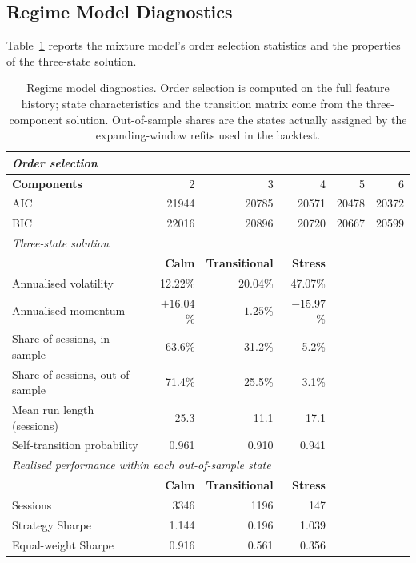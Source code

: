 \documentclass{singlecol-new}
\theoremstyle{TH}{
\newtheorem{lemma}{Lemma}
\newtheorem{theorem}[lemma]{Theorem}
\newtheorem{corrolary}[lemma]{Corrolary}
\newtheorem{conjecture}[lemma]{Conjecture}
\newtheorem{proposition}[lemma]{Proposition}
\newtheorem{claim}[lemma]{Claim}
\newtheorem{stheorem}[lemma]{Wrong Theorem}
\newtheorem{algorithm}{Algorithm}
}
\theoremstyle{THrm}{
\newtheorem{definition}{Definition}[section]
\newtheorem{question}{Question}[section]
\newtheorem{remark}{Remark}
\newtheorem{scheme}{Scheme}
}
\theoremstyle{THhit}{
\newtheorem{case}{Case}[section]
}
\begin{document}
\subsection{Regime Model Diagnostics}
\label{sec:regimefit}

Table~\ref{tab:regimefit} reports the mixture model's order selection statistics and the properties of
the three-state solution.

\begin{table}[!ht]
\centering
\caption{Regime model diagnostics. Order selection is computed on the full feature
history; state characteristics and the transition matrix come from the three-component
solution. Out-of-sample shares are the states actually assigned by the expanding-window
refits used in the backtest.}
\label{tab:regimefit}
\small
\begin{tabular}{p{3.2cm}rrrrr}
\hline
\multicolumn{6}{l}{\textit{Order selection}} \\
\hline
\textbf{Components} & 2 & 3 & 4 & 5 & 6 \\
AIC & 21944 & 20785 & 20571 & 20478 & 20372 \\
BIC & 22016 & 20896 & 20720 & 20667 & 20599 \\
\hline
\multicolumn{6}{l}{\textit{Three-state solution}} \\
\hline
& \textbf{Calm} & \textbf{Transitional} & \textbf{Stress} & & \\
Annualised volatility & 12.22\% & 20.04\% & 47.07\% & & \\
Annualised momentum & $+16.04$\% & $-1.25$\% & $-15.97$\% & & \\
Share of sessions, in sample & 63.6\% & 31.2\% & 5.2\% & & \\
Share of sessions, out of sample & 71.4\% & 25.5\% & 3.1\% & & \\
Mean run length (sessions) & 25.3 & 11.1 & 17.1 & & \\
Self-transition probability & 0.961 & 0.910 & 0.941 & & \\
\hline
\multicolumn{6}{l}{\textit{Realised performance within each out-of-sample state}} \\
\hline
& \textbf{Calm} & \textbf{Transitional} & \textbf{Stress} & & \\
Sessions & 3346 & 1196 & 147 & & \\
Strategy Sharpe & 1.144 & 0.196 & 1.039 & & \\
Equal-weight Sharpe & 0.916 & 0.561 & 0.356 & & \\
\hline
\end{tabular}
\end{table}
\end{document}
